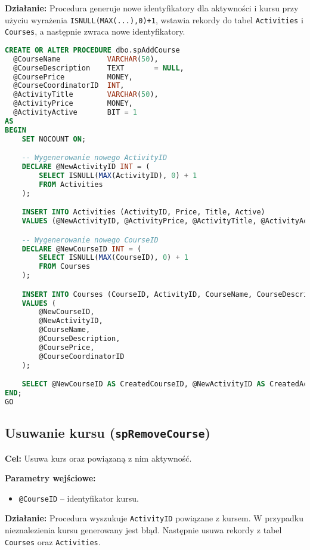 \documentclass[12pt]{article}
\begin{document}
\textbf{Działanie:} Procedura generuje nowe identyfikatory dla aktywności i kursu przy użyciu wyrażenia \verb|ISNULL(MAX(...),0)+1|, wstawia rekordy do tabel \verb|Activities| i \verb|Courses|, a następnie zwraca nowe identyfikatory.

\begin{lstlisting}[language=SQL]
CREATE OR ALTER PROCEDURE dbo.spAddCourse
  @CourseName           VARCHAR(50),
  @CourseDescription    TEXT       = NULL,
  @CoursePrice          MONEY,
  @CourseCoordinatorID  INT,
  @ActivityTitle        VARCHAR(50),
  @ActivityPrice        MONEY,
  @ActivityActive       BIT = 1
AS
BEGIN
    SET NOCOUNT ON;

    -- Wygenerowanie nowego ActivityID
    DECLARE @NewActivityID INT = (
        SELECT ISNULL(MAX(ActivityID), 0) + 1 
        FROM Activities
    );

    INSERT INTO Activities (ActivityID, Price, Title, Active)
    VALUES (@NewActivityID, @ActivityPrice, @ActivityTitle, @ActivityActive);

    -- Wygenerowanie nowego CourseID
    DECLARE @NewCourseID INT = (
        SELECT ISNULL(MAX(CourseID), 0) + 1
        FROM Courses
    );

    INSERT INTO Courses (CourseID, ActivityID, CourseName, CourseDescription, CoursePrice, CourseCoordinatorID)
    VALUES (
        @NewCourseID,
        @NewActivityID,
        @CourseName,
        @CourseDescription,
        @CoursePrice,
        @CourseCoordinatorID
    );

    SELECT @NewCourseID AS CreatedCourseID, @NewActivityID AS CreatedActivityID;
END;
GO
\end{lstlisting}

\subsection{Usuwanie kursu (\texttt{spRemoveCourse})}
\textbf{Cel:} Usuwa kurs oraz powiązaną z nim aktywność.

\textbf{Parametry wejściowe:}
\begin{itemize}
  \item \texttt{@CourseID} – identyfikator kursu.
\end{itemize}

\textbf{Działanie:} Procedura wyszukuje \verb|ActivityID| powiązane z kursem. W przypadku nieznalezienia kursu generowany jest błąd. Następnie usuwa rekordy z tabel \verb|Courses| oraz \verb|Activities|.
\end{document}
